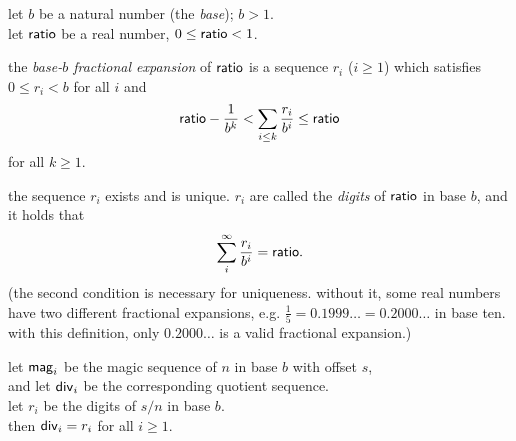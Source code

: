 \documentclass[a4paper, 12pt]{report}
\begin{document}
\begin{definition}
	let $b$ be a natural number (the \emph{base}); $b > 1$. \\
	let $\mathsf{ratio}$ be a real number, $0 \leq \mathsf{ratio} < 1$. \medskip

	the \emph{base-$b$ fractional expansion} of $\mathsf{ratio}$ is a sequence $r_i$ ($i \geq 1$) which satisfies \\ $0 \leq r_i < b$ for all $i$ and
	\begin{equation*}
		\mathsf{ratio} - \frac{1}{b^k} < \sum_{i \leq k} \frac{r_i}{b^i} \leq \mathsf{ratio}
	\end{equation*}
	for all $k \geq 1$. \medskip

	the sequence $r_i$ exists and is unique. $r_i$ are called the \emph{digits} of $\mathsf{ratio}$ in base $b$, and it holds that
	\begin{equation*}
		\sum_i^{\infty} \frac{r_i}{b^i} = \mathsf{ratio}.
	\end{equation*}
	(the second condition is necessary for uniqueness. without it, some real numbers have two different fractional expansions, e.g. $\frac{1}{5} = 0.1999\ldots = 0.2000\ldots$ in base ten. with this definition, only $0.2000\ldots$ is a valid fractional expansion.)
\end{definition}

\begin{theorem}
	let $\mathsf{mag}_i$ be the magic sequence of $n$ in base $b$ with offset $s$, \\
	and let $\mathsf{div}_i$ be the corresponding quotient sequence. \\
	let $r_i$ be the digits of $s/n$ in base $b$. \\
	then $\mathsf{div}_i = r_i$ for all $i \geq 1$.
\end{theorem}
\end{document}
